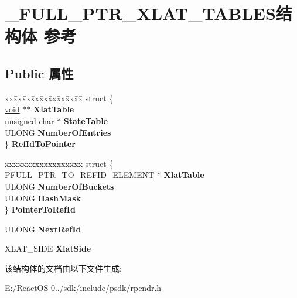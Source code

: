 \hypertarget{struct___f_u_l_l___p_t_r___x_l_a_t___t_a_b_l_e_s}{}\section{\+\_\+\+F\+U\+L\+L\+\_\+\+P\+T\+R\+\_\+\+X\+L\+A\+T\+\_\+\+T\+A\+B\+L\+E\+S结构体 参考}
\label{struct___f_u_l_l___p_t_r___x_l_a_t___t_a_b_l_e_s}
\subsection*{Public 属性}
\begin{DoxyCompactItemize}
\item 
\mbox{\label{struct___f_u_l_l___p_t_r___x_l_a_t___t_a_b_l_e_s_a3a21123019d856f5dbf88623a7e20e10}} 
\begin{tabbing}
xx\=xx\=xx\=xx\=xx\=xx\=xx\=xx\=xx\=\kill
struct \{\\
\>\hyperlink{interfacevoid}{void} $\ast$$\ast$ {\bfseries XlatTable}\\
\>unsigned char $\ast$ {\bfseries StateTable}\\
\>ULONG {\bfseries NumberOfEntries}\\
\} {\bfseries RefIdToPointer}\\

\end{tabbing}\item 
\mbox{\label{struct___f_u_l_l___p_t_r___x_l_a_t___t_a_b_l_e_s_ab5ddbed5b5d948f85f1ba3bef796c405}} 
\begin{tabbing}
xx\=xx\=xx\=xx\=xx\=xx\=xx\=xx\=xx\=\kill
struct \{\\
\>\hyperlink{struct___f_u_l_l___p_t_r___t_o___r_e_f_i_d___e_l_e_m_e_n_t}{PFULL\_PTR\_TO\_REFID\_ELEMENT} $\ast$ {\bfseries XlatTable}\\
\>ULONG {\bfseries NumberOfBuckets}\\
\>ULONG {\bfseries HashMask}\\
\} {\bfseries PointerToRefId}\\

\end{tabbing}\item 
\mbox{\label{struct___f_u_l_l___p_t_r___x_l_a_t___t_a_b_l_e_s_a84f09c71f58ca84b532c60f7d2dfa8a7}} 
U\+L\+O\+NG {\bfseries Next\+Ref\+Id}
\item 
\mbox{\label{struct___f_u_l_l___p_t_r___x_l_a_t___t_a_b_l_e_s_aaf05a4e680481be8a5c064a903671232}} 
X\+L\+A\+T\+\_\+\+S\+I\+DE {\bfseries Xlat\+Side}
\end{DoxyCompactItemize}


该结构体的文档由以下文件生成\+:\begin{DoxyCompactItemize}
\item 
E\+:/\+React\+O\+S-\/0../sdk/include/psdk/rpcndr.\+h\end{DoxyCompactItemize}
